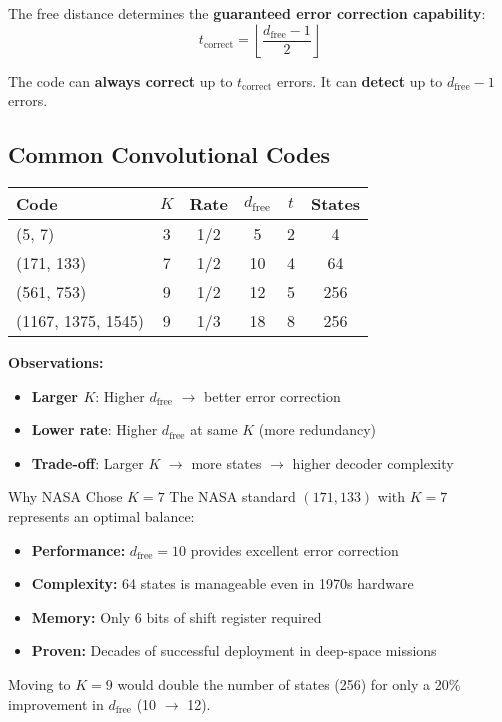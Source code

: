 The free distance determines the \textbf{guaranteed error correction capability}:
\begin{equation}
t_{\text{correct}} = \left\lfloor \frac{d_{\text{free}} - 1}{2} \right\rfloor
\label{eq:error-correction-capability}
\end{equation}

The code can \textbf{always correct} up to $t_{\text{correct}}$ errors. It can \textbf{detect} up to $d_{\text{free}} - 1$ errors.

\subsection{Common Convolutional Codes}

\begin{center}
\begin{tabular}{@{}lccccc@{}}
\toprule
\textbf{Code} & \textbf{$K$} & \textbf{Rate} & \textbf{$d_{\text{free}}$} & \textbf{$t$} & \textbf{States} \\
\midrule
(5, 7) & 3 & 1/2 & 5 & 2 & 4 \\
(171, 133) & 7 & 1/2 & 10 & 4 & 64 \\
(561, 753) & 9 & 1/2 & 12 & 5 & 256 \\
(1167, 1375, 1545) & 9 & 1/3 & 18 & 8 & 256 \\
\bottomrule
\end{tabular}
\end{center}

\textbf{Observations:}
\begin{itemize}
\item \textbf{Larger $K$}: Higher $d_{\text{free}}$ $\rightarrow$ better error correction
\item \textbf{Lower rate}: Higher $d_{\text{free}}$ at same $K$ (more redundancy)
\item \textbf{Trade-off}: Larger $K$ $\rightarrow$ more states $\rightarrow$ higher decoder complexity
\end{itemize}

\begin{calloutbox}{Why NASA Chose $K=7$}
The NASA standard $(171, 133)$ with $K=7$ represents an optimal balance:
\begin{itemize}
\item \textbf{Performance:} $d_{\text{free}} = 10$ provides excellent error correction
\item \textbf{Complexity:} 64 states is manageable even in 1970s hardware
\item \textbf{Memory:} Only 6 bits of shift register required
\item \textbf{Proven:} Decades of successful deployment in deep-space missions
\end{itemize}

Moving to $K=9$ would double the number of states (256) for only a 20\% improvement in $d_{\text{free}}$ (10 $\to$ 12).
\end{calloutbox}

